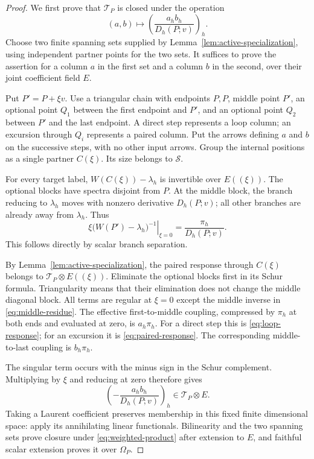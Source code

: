 \documentclass[11pt]{article}
\theoremstyle{definition}
\theoremstyle{remark}
\numberwithin{equation}{section}
\begin{document}
\begin{proof}
We first prove that $\mathcal T_P$ is closed under the operation
\begin{equation}
(a,b)\longmapsto
 \left(\frac{a_hb_h}{D_h(P;v)}\right)_h.
 \label{eq:weighted-product}
\end{equation}
Choose two finite spanning sets supplied by
Lemma~\ref{lem:active-specialization}, using independent partner
points for the two sets.  It suffices to prove the assertion for a
column $a$ in the first set and a column $b$ in the second, over their
joint coefficient field $E$.

Put $P'=P+\xi v$.  Use a triangular chain with endpoints $P,P$,
middle point $P'$, an optional point $Q_1$ between the first endpoint
and $P'$, and an optional point $Q_2$ between $P'$ and the last
endpoint.  A direct step represents a loop column; an excursion
through $Q_i$ represents a paired column.  Put the arrows defining
$a$ and $b$ on the successive steps, with no other input arrows.
Group the internal positions as a single partner $C(\xi)$.  Its
size belongs to $\mathcal S$.

For every target label, $W(C(\xi))-\lambda_h$ is invertible over
$E((\xi))$.  The optional blocks have spectra disjoint from $P$.
At the middle block, the branch reducing to $\lambda_h$ moves with
nonzero derivative $D_h(P;v)$; all other branches are already away
from $\lambda_h$.  Thus
\begin{equation}
\left.\xi\bigl(W(P')-\lambda_h\bigr)^{-1}\right|_{\xi=0}
   =\frac{\pi_h}{D_h(P;v)}.
 \label{eq:middle-residue}
\end{equation}
This follows directly by scalar branch separation.

By Lemma~\ref{lem:active-specialization}, the paired response through
$C(\xi)$ belongs to $\mathcal T_P\otimes E((\xi))$.  Eliminate
the optional blocks first in its Schur formula.  Triangularity means
that their elimination does not change the middle diagonal block.
All terms are regular at $\xi=0$ except the middle inverse in
\eqref{eq:middle-residue}.  The effective first-to-middle coupling,
compressed by $\pi_h$ at both ends and evaluated at zero, is
$a_h\pi_h$.  For a direct step this is
\eqref{eq:loop-response}; for an excursion it is
\eqref{eq:paired-response}.  The corresponding middle-to-last
coupling is $b_h\pi_h$.

The singular term occurs with the minus sign in the Schur
complement.  Multiplying by $\xi$ and reducing at zero therefore
gives
\[
 \left(-\frac{a_hb_h}{D_h(P;v)}\right)_h
       \in\mathcal T_P\otimes E.
\]
Taking a Laurent coefficient preserves membership in this fixed
finite dimensional space: apply its annihilating linear functionals.
Bilinearity and the two spanning sets prove closure under
\eqref{eq:weighted-product} after extension to $E$, and faithful
scalar extension proves it over $\Omega_P$.


\end{proof}
\end{document}
